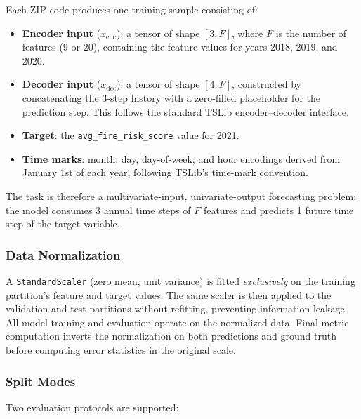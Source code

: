 \documentclass[11pt]{article}
\begin{document}
Each ZIP code produces one training sample consisting of:
\begin{itemize}
  \item \textbf{Encoder input} ($x_\text{enc}$): a tensor of shape $[3, F]$, where $F$ is the number of features (9 or 20), containing the feature values for years 2018, 2019, and 2020.
  \item \textbf{Decoder input} ($x_\text{dec}$): a tensor of shape $[4, F]$, constructed by concatenating the 3-step history with a zero-filled placeholder for the prediction step. This follows the standard TSLib encoder--decoder interface.
  \item \textbf{Target}: the \texttt{avg\_fire\_risk\_score} value for 2021.
  \item \textbf{Time marks}: month, day, day-of-week, and hour encodings derived from January 1st of each year, following TSLib's time-mark convention.
\end{itemize}

The task is therefore a multivariate-input, univariate-output forecasting problem: the model consumes 3 annual time steps of $F$ features and predicts 1 future time step of the target variable.

\subsubsection*{Data Normalization}

A \texttt{StandardScaler} (zero mean, unit variance) is fitted \emph{exclusively} on the training partition's feature and target values. The same scaler is then applied to the validation and test partitions without refitting, preventing information leakage. All model training and evaluation operate on the normalized data. Final metric computation inverts the normalization on both predictions and ground truth before computing error statistics in the original scale.

\subsubsection*{Split Modes}

Two evaluation protocols are supported:
\end{document}
